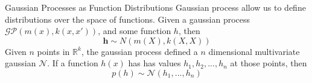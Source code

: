 \documentclass[10pt]{beamer}
\begin{document}
\begin{frame}{Gaussian Processes as Function Distributions}
  Gaussian process allow us to define distributions over the space of functions. Given a gaussian process $\mathcal{GP} \left( m(x) , k(x,x') \right)$, and some function $h$, then
  \begin{equation}
    \mathbf{h} \sim N(m(X) , k(X,X))
  \end{equation}
  Given $n$ points in $\mathbb{R}^{k}$, the gaussian process defined a $n$ dimensional multivariate gaussian $\mathcal{N}$. If a function $h(x)$ has has values $h_1,h_2,...,h_{n}$ at those points, then
  \begin{equation}
    p \left( h \right) \sim \mathcal{N}(h_{1}, ..., h_{n})
  \end{equation}

  \begin{center}
  \end{center}
\end{frame}
\end{document}
